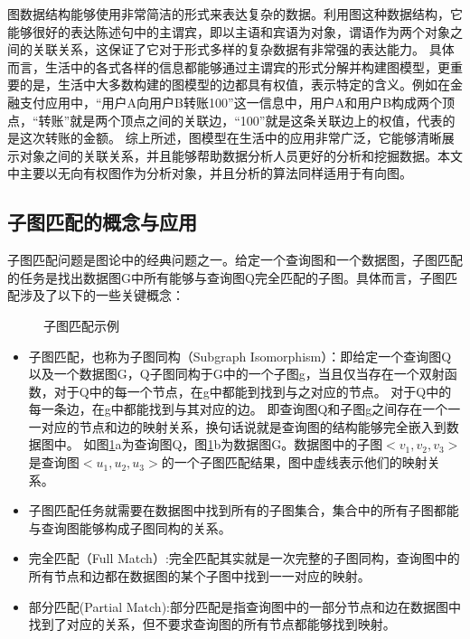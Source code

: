 图数据结构能够使用非常简洁的形式来表达复杂的数据。利用图这种数据结构，它能够很好的表达陈述句中的主谓宾，即以主语和宾语为对象，谓语作为两个对象之间的关联关系，这保证了它对于形式多样的复杂数据有非常强的表达能力。
具体而言，生活中的各式各样的信息都能够通过主谓宾的形式分解并构建图模型，更重要的是，生活中大多数构建的图模型的边都具有权值，表示特定的含义。例如在金融支付应用中，“用户A向用户B转账100”这一信息中，用户A和用户B构成两个顶点，“转账”就是两个顶点之间的关联边，“100”就是这条关联边上的权值，代表的是这次转账的金额。
综上所述，图模型在生活中的应用非常广泛，它能够清晰展示对象之间的关联关系，并且能够帮助数据分析人员更好的分析和挖掘数据。本文中主要以无向有权图作为分析对象，并且分析的算法同样适用于有向图。

\subsection{子图匹配的概念与应用}
子图匹配问题是图论中的经典问题之一。给定一个查询图和一个数据图，子图匹配的任务是找出数据图G中所有能够与查询图Q完全匹配的子图。具体而言，子图匹配涉及了以下的一些关键概念：
\begin{figure}[h!]
    \centering
    \caption{子图匹配示例}
    \label{fig:example_subgraph_matching}
\end{figure}
\begin{itemize}
    \item 子图匹配，也称为子图同构（Subgraph Isomorphism）：即给定一个查询图Q以及一个数据图G，Q子图同构于G中的一个子图g，当且仅当存在一个双射函数，对于Q中的每一个节点，在g中都能到找到与之对应的节点。
    对于Q中的每一条边，在g中都能找到与其对应的边。
    即查询图Q和子图g之间存在一个一一对应的节点和边的映射关系，换句话说就是查询图的结构能够完全嵌入到数据图中。
    如图\ref{fig:example_subgraph_matching}a为查询图Q，图\ref{fig:example_subgraph_matching}b为数据图G。数据图中的子图$<v_1,v_2,v_3>$是查询图$<u_1,u_2,u_3>$的一个子图匹配结果，图中虚线表示他们的映射关系。
    \item 子图匹配任务就需要在数据图中找到所有的子图集合，集合中的所有子图都能与查询图能够构成子图同构的关系。
    \item 完全匹配（Full Match）:完全匹配其实就是一次完整的子图同构，查询图中的所有节点和边都在数据图的某个子图中找到一一对应的映射。
    \item 部分匹配(Partial Match):部分匹配是指查询图中的一部分节点和边在数据图中找到了对应的关系，但不要求查询图的所有节点都能够找到映射。
\end{itemize}

